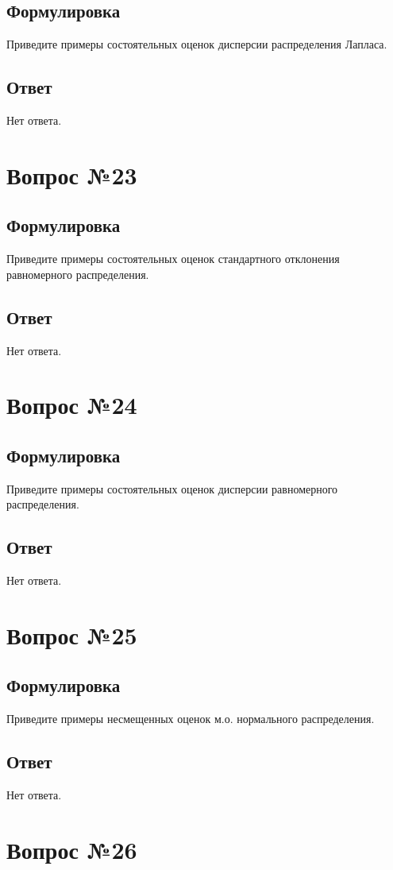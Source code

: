 \documentclass[a4]{article}
\begin{document}
	\subsection*{Формулировка}
	Приведите примеры состоятельных оценок дисперсии распределения Лапласа.
	\subsection*{Ответ}
	Нет ответа.
	
	\section{Вопрос №23}
	\subsection*{Формулировка}
	Приведите примеры состоятельных оценок стандартного отклонения равномерного
распределения.
	\subsection*{Ответ}
	Нет ответа.
	
	\section{Вопрос №24}
	\subsection*{Формулировка}
	Приведите примеры состоятельных оценок дисперсии равномерного распределения.
	\subsection*{Ответ}
	Нет ответа.
	
	\section{Вопрос №25}
	\subsection*{Формулировка}
	Приведите примеры несмещенных оценок м.о. нормального распределения.
	\subsection*{Ответ}
	Нет ответа.
	
	\section{Вопрос №26}
\end{document}
